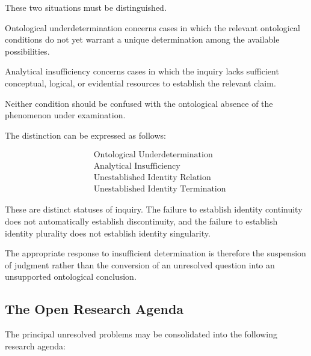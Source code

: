 These two situations must be distinguished.

Ontological underdetermination concerns cases in
which the relevant ontological conditions do not yet
warrant a unique determination among the available
possibilities.

Analytical insufficiency concerns cases in which the
inquiry lacks sufficient conceptual, logical, or
evidential resources to establish the relevant claim.

Neither condition should be confused with the
ontological absence of the phenomenon under examination.

The distinction can be expressed as follows:

\[
\begin{aligned}
&\text{Ontological Underdetermination} \\
&\text{Analytical Insufficiency} \\
&\text{Unestablished Identity Relation} \\
&\text{Unestablished Identity Termination}
\end{aligned}
\]

These are distinct statuses of inquiry. The failure
to establish identity continuity does not automatically
establish discontinuity, and the failure to establish
identity plurality does not establish identity singularity.

The appropriate response to insufficient determination
is therefore the suspension of judgment rather than
the conversion of an unresolved question into an
unsupported ontological conclusion.


\subsection{The Open Research Agenda}

The principal unresolved problems may be consolidated
into the following research agenda:

